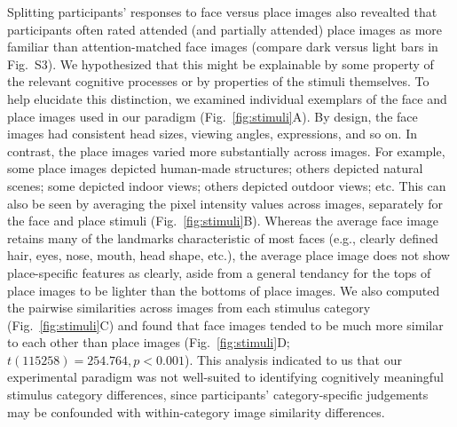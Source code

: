 \documentclass[english]{article}
\newcommand{\ratingsByCategory}{S3}
\begin{document}
Splitting participants' responses to face versus place images also revealted
that participants often rated attended (and partially attended) place images as
more familiar than attention-matched face images (compare dark versus light
bars in Fig.~\ratingsByCategory). We hypothesized that this might be
explainable by some property of the relevant cognitive processes or by
properties of the stimuli themselves. To help elucidate this distinction, we
examined individual exemplars of the face and place images used in our paradigm
(Fig.~\ref{fig:stimuli}A). By design, the face images had consistent head
sizes, viewing angles, expressions, and so on. In contrast, the place images
varied more substantially across images. For example, some place images
depicted human-made structures; others depicted natural scenes; some depicted
indoor views; others depicted outdoor views; etc. This can also be seen by
averaging the pixel intensity values across images, separately for the face and
place stimuli (Fig.~\ref{fig:stimuli}B). Whereas the average face image retains
many of the landmarks characteristic of most faces (e.g., clearly defined hair,
eyes, nose, mouth, head shape, etc.), the average place image does not show
place-specific features as clearly, aside from a general tendancy for the tops
of place images to be lighter than the bottoms of place images. We also
computed the pairwise similarities across images from each stimulus category
(Fig.~\ref{fig:stimuli}C) and found that face images tended to be much more
similar to each other than place images (Fig.~\ref{fig:stimuli}D; $t(115258) =
254.764, p < 0.001$). This analysis indicated to us that our experimental
paradigm was not well-suited to identifying cognitively meaningful stimulus
category differences, since participants' category-specific judgements may be
confounded with within-category image similarity differences.
\end{document}
